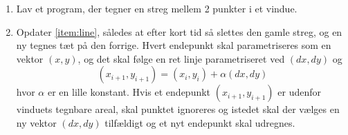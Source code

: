 \begin{enumerate}
\item \label{item:line} Lav et program, der tegner en streg mellem 2 punkter i et
  vindue.
\item Opdater \ref{item:line}, således at efter kort tid så slettes
  den gamle streg, og en ny tegnes tæt på den forrige. Hvert endepunkt
  skal parametriseres som en vektor $(x,y)$, og det skal følge en ret
  linje parametriseret ved $(dx, dy)$ og
  \begin{equation}
    (x_{i+1}, y_{i+1}) = (x_i,y_i) + \alpha (dx, dy)
  \end{equation}
  hvor $\alpha$ er en lille konstant. Hvis et endepunkt $(x_{i+1}, y_{i+1})$ er
  udenfor vinduets tegn\-bare areal, skal punktet ignoreres og istedet
  skal der vælges en ny vektor $(dx,dy)$ tilfældigt og et nyt
  endepunkt skal udregnes.
\end{enumerate}
